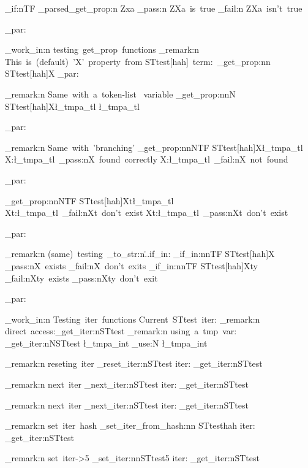 \documentclass{article}
\begin{document}
\bool_if:nTF { \starray_parsed_get_prop:n {Zxa} }
  {  \sttests_pass:n {ZXa~is~true } }
  {   \sttests_fail:n {ZXa~isn't~true } }





\sttests_par:

  
  
\sttests_work_in:n {testing~get_prop~functions}
\sttests_remark:n {This~is~(default)~'X'~property~from STtest[hah]~term:~}\starray_get_prop:nn {STtest[hah]}{X}
\sttests_par:


\sttests_remark:n {Same~with~a~token-list~ variable}
\starray_get_prop:nnN {STtest[hah]}{X}\l_tmpa_tl
\l_tmpa_tl

\sttests_par:

\sttests_remark:n {Same~with~'branching'}
\starray_get_prop:nnNTF {STtest[hah]}{X}\l_tmpa_tl
  {X:\l_tmpa_tl~\sttests_pass:n{X~found~correctly}}
  {X:\l_tmpa_tl~\sttests_fail:n{X~not~found}}

\sttests_par:

\starray_get_prop:nnNTF {STtest[hah]}{Xt}\l_tmpa_tl
  {Xt:\l_tmpa_tl~\sttests_fail:n{Xt~don't~exist}}
  {Xt:\l_tmpa_tl~\sttests_pass:n{Xt~don't~exist}}

\sttests_par:

\sttests_remark:n {(same)~testing~\tl_to_str:n{\...if_in:}}
\starray_if_in:nnTF {STtest[hah]}{X}
  {\sttests_pass:n{X~exists}}
  {\sttests_fail:n{X~don't~exits}}
\starray_if_in:nnTF {STtest[hah]}{Xty}
  {\sttests_fail:n{Xty~exists}}
  {\sttests_pass:n{Xty~don't~exit}}

 
\sttests_par:


\sttests_work_in:n {Testing~iter~functions}
Current~STtest~iter: 
\sttests_remark:n {direct~access:\starray_get_iter:n{STtest}}
\sttests_remark:n {using~a~tmp~var: \starray_get_iter:nN{STtest} \l_tmpa_int \int_use:N \l_tmpa_int}

\sttests_remark:n {reseting~iter} \starray_reset_iter:n{STtest}
iter: \starray_get_iter:n{STtest}

\sttests_remark:n {next~iter} \starray_next_iter:n{STtest}
iter: \starray_get_iter:n{STtest}

\sttests_remark:n {next~iter} \starray_next_iter:n{STtest}
iter: \starray_get_iter:n{STtest}


\sttests_remark:n {set~iter~hash} \starray_set_iter_from_hash:nn {STtest}{hah}
iter: \starray_get_iter:n{STtest}


\sttests_remark:n {set~iter->5} \starray_set_iter:nn{STtest}{5}
iter: \starray_get_iter:n{STtest}
\end{document}
